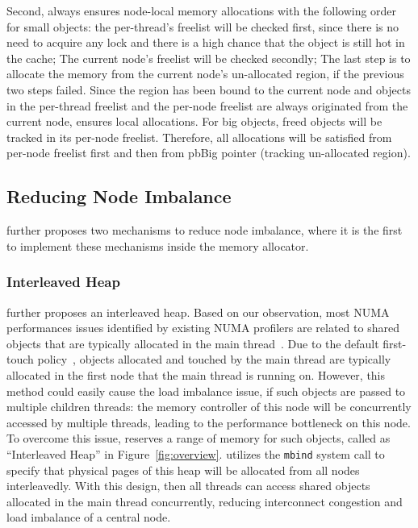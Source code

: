 Second, \NM{} always ensures node-local memory allocations with the following order for small objects: the per-thread's freelist will be checked first, since there is no need to acquire any lock and there is a high chance that the object is still hot in the cache; The current node's freelist will be checked secondly; The last step is to allocate the memory from the current node's un-allocated region, if the previous two steps failed. Since the region has been bound to the current node and objects in the per-thread freelist and the per-node freelist are always originated from the current node, \NM{} ensures local allocations. For big objects, freed objects will be tracked in its per-node freelist. Therefore, all allocations will be satisfied from per-node freelist first and then from pbBig pointer (tracking un-allocated region). 

\subsection{Reducing Node Imbalance}
\label{sec:balance}

\NM{} further proposes two mechanisms to reduce node imbalance, where it is the first to implement these mechanisms inside the memory allocator. 
\subsubsection{Interleaved Heap} 
\NA{} further proposes an interleaved heap. Based on our observation, most NUMA performances issues identified by existing NUMA profilers are related to shared objects that are typically allocated in the main thread~\citep{XULIU, MemProf}. Due to the default first-touch policy~\citep{lameter2013numa, diener2015locality}, objects allocated and touched by the main thread are typically allocated in the first node that the main thread is running on. However, this method could easily cause the load imbalance issue, if such objects are passed to multiple children threads: the memory controller of this node will be concurrently accessed by multiple threads, leading to the performance bottleneck on this node. To overcome this issue, \NA{} reserves a range of memory for such objects, called as ``Interleaved Heap'' in Figure~\ref{fig:overview}. \NA{} utilizes the \texttt{mbind} system call to specify that physical pages of this heap will be allocated from all nodes interleavedly. With this design, then all threads can access shared objects allocated in the main thread concurrently, reducing interconnect congestion and load imbalance of a central node. 

